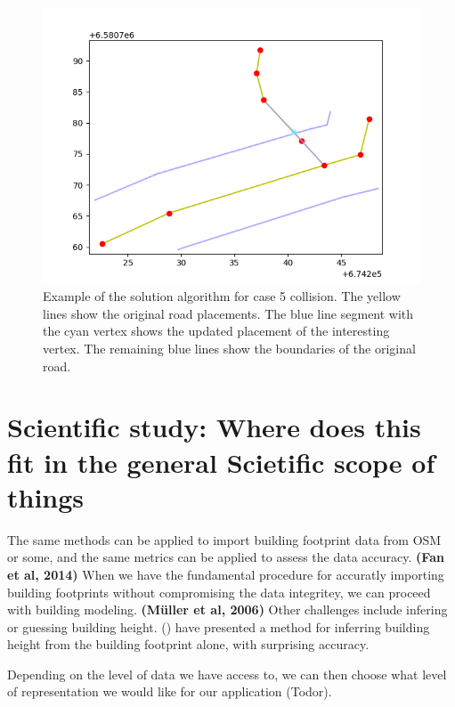 \documentclass{kththesis}
\begin{document}
\begin{figure}[H]
    \centering
    \includegraphics[width=\textwidth,height=0.5\textheight,keepaspectratio]{img_feature_overlap_fix_4}
    \caption{Example of the solution algorithm for case 5 collision. The yellow lines show the original road placements. The blue line segment with the cyan vertex shows the updated placement of the interesting vertex. The remaining blue lines show the boundaries of the original road.}
    \label{fig:collision-case-5}
\end{figure}

\section{Scientific study: Where does this fit in the general Scietific scope of things}

The same methods can be applied to import building footprint data from OSM or some, and the same metrics can be applied to assess the data accuracy. \textbf{(Fan et al, 2014)}
When we have the fundamental procedure for accuratly importing building footprints without compromising the data integritey, we can proceed with building modeling. \textbf{(Müller et al, 2006)} Other challenges include infering or guessing building height. () have presented a method for inferring building height from the building footprint alone, with surprising accuracy.

Depending on the level of data we have access to, we can then choose what level of representation we would like for our application (Todor).
\end{document}
